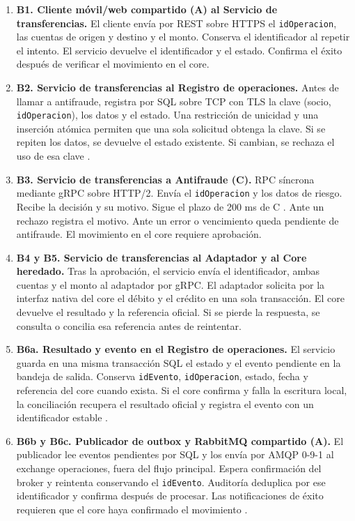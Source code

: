 \documentclass[12pt,a4paper]{article}
\begin{document}
\begin{enumerate}
    \item \textbf{B1. Cliente móvil/web compartido (A) al Servicio de transferencias.}
    El cliente envía por REST sobre HTTPS el \texttt{idOperacion}, las cuentas de origen y destino y el monto. Conserva el identificador al repetir el intento. El servicio devuelve el identificador y el estado. Confirma el éxito después de verificar el movimiento en el core.

    \item \textbf{B2. Servicio de transferencias al Registro de operaciones.}
    Antes de llamar a antifraude, registra por SQL sobre TCP con TLS la clave (socio, \texttt{idOperacion}), los datos y el estado. Una restricción de unicidad y una inserción atómica permiten que una sola solicitud obtenga la clave. Si se repiten los datos, se devuelve el estado existente. Si cambian, se rechaza el uso de esa clave \cite{featonbyretries}.

    \item \textbf{B3. Servicio de transferencias a Antifraude (C).}
    RPC síncrona mediante gRPC sobre HTTP/2. Envía el \texttt{idOperacion} y los datos de riesgo. Recibe la decisión y su motivo. Sigue el plazo de 200 ms de C \cite{grpcdeadlines}. Ante un rechazo registra el motivo. Ante un error o vencimiento queda pendiente de antifraude. El movimiento en el core requiere aprobación.

    \item \textbf{B4 y B5. Servicio de transferencias al Adaptador y al Core heredado.}
    Tras la aprobación, el servicio envía el identificador, ambas cuentas y el monto al adaptador por gRPC. El adaptador solicita por la interfaz nativa del core el débito y el crédito en una sola transacción. El core devuelve el resultado y la referencia oficial. Si se pierde la respuesta, se consulta o concilia esa referencia antes de reintentar.

    \item \textbf{B6a. Resultado y evento en el Registro de operaciones.}
    El servicio guarda en una misma transacción SQL el estado y el evento pendiente en la bandeja de salida. Conserva \texttt{idEvento}, \texttt{idOperacion}, estado, fecha y referencia del core cuando exista. Si el core confirma y falla la escritura local, la conciliación recupera el resultado oficial y registra el evento con un identificador estable \cite{awsoutbox}.

    \item \textbf{B6b y B6c. Publicador de outbox y RabbitMQ compartido (A).}
    El publicador lee eventos pendientes por SQL y los envía por AMQP 0-9-1 al exchange operaciones, fuera del flujo principal. Espera confirmación del broker y reintenta conservando el \texttt{idEvento}. Auditoría deduplica por ese identificador y confirma después de procesar. Las notificaciones de éxito requieren que el core haya confirmado el movimiento \cite{awsoutbox}.

\end{enumerate}
\end{document}
